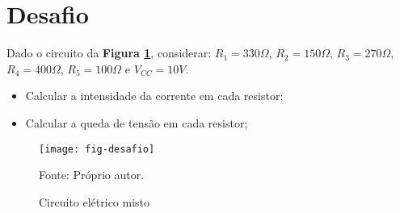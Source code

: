 \section{Desafio}

\begin{minipage}{\linewidth}
  \centering
  \begin{minipage}{0.45\linewidth}
    Dado o circuito da \textbf{Figura \ref{fig:CircuitoDesafio}},
    considerar: $R_1 = 330\Omega$,
                $R_2 = 150\Omega$,
                $R_3 = 270\Omega$, \\
                $R_4 = 400\Omega$,
                $R_5 = 100\Omega$ e
                $V_{CC} = 10V$.
    \begin{itemize}
      \item Calcular a intensidade da corrente em cada resistor;
      \item Calcular a queda de tensão em cada resistor;
    \end{itemize}
  \end{minipage}
  \hspace{0.05\linewidth}
  \begin{minipage}{0.45\linewidth}
    \begin{figure}[H]
      \centering
      \caption{Circuito elétrico misto}
      \label{fig:CircuitoDesafio}
      \texttt{[image: fig-desafio]}

      {\small Fonte: Próprio autor.}
    \end{figure}
  \end{minipage}
\end{minipage}
